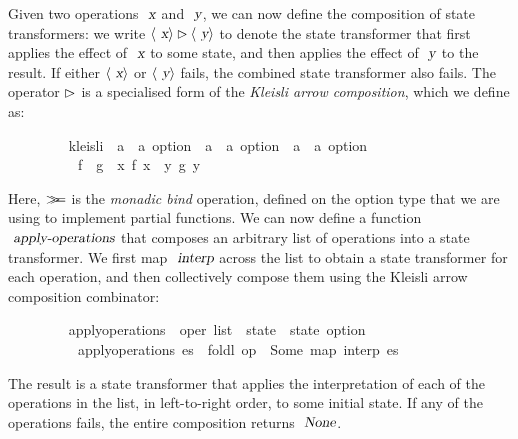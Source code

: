 Given two operations $\isa{x}$ and $\isa{y}$, we can now define the composition of state transformers: we write $\langle\isa{x}\rangle \mathbin{\isasymrhd} \langle\isa{y}\rangle$ to denote the state transformer that first applies the effect of $\isa{x}$ to some state, and then applies the effect of $\isa{y}$ to the result.
If either $\langle\isa{x}\rangle$ or $\langle\isa{y}\rangle$ fails, the combined state transformer also fails.
The operator $\emph{$\rhd$}$ is a specialised form of the \emph{Kleisli arrow composition}, which we define as:
\vspace{0.35em}
\begin{isabellebody}
\ \ \ \ \ \ \ \  kleisli\ {\isacharcolon}{\isacharcolon}\ {\isachardoublequoteopen}{\isacharparenleft}{\isacharprime}a\ {\isasymRightarrow}\ {\isacharprime}a\ option{\isacharparenright}\ {\isasymRightarrow}\ {\isacharparenleft}{\isacharprime}a\ {\isasymRightarrow}\ {\isacharprime}a\ option{\isacharparenright}\ {\isasymRightarrow}\ {\isacharparenleft}{\isacharprime}a\ {\isasymRightarrow}\ {\isacharprime}a\ option{\isacharparenright}{\isachardoublequoteclose}\ \isanewline
\ \ \ \ \ \ \ \ \ \ {\isachardoublequoteopen}f\ {\isasymrhd}\ g\ {\isasymequiv}\ {\isasymlambda}x{\isachardot}\ f\ x\ {\isasymbind}\ {\isacharparenleft}{\isasymlambda}y{\isachardot}\ g\ y{\isacharparenright}{\isachardoublequoteclose}
\end{isabellebody}
\vspace{0.35em}
Here, $\emph{$\mathbin{>\!\!\!>\mkern-6.7mu=}$}$ is the \emph{monadic bind} operation, defined on the option type that we are using to implement partial functions.
We can now define a function $\isa{apply-operations}$ that composes an arbitrary list of operations into a state transformer.
We first map $\isa{interp}$ across the list to obtain a state transformer for each operation, and then collectively compose them using the Kleisli arrow composition combinator:
\vspace{0.35em}
\begin{isabellebody}
\ \ \ \ \ \ \ \  apply{\isacharunderscore}operations\ {\isacharcolon}{\isacharcolon}\ {\isachardoublequoteopen}{\isacharprime}oper\ list\ {\isasymRightarrow}\ {\isacharprime}state\ {\isasymRightarrow}\ {\isacharprime}state\ option{\isachardoublequoteclose}\ \isanewline
\ \ \ \ \ \ \ \ \ \ {\isachardoublequoteopen}apply{\isacharunderscore}operations\ es\ {\isasymequiv}\ foldl\ {\isacharparenleft}op\ {\isasymrhd}{\isacharparenright}\ Some\ {\isacharparenleft}map\ interp\ es{\isacharparenright}{\isachardoublequoteclose}
\end{isabellebody}
\vspace{0.35em}
The result is a state transformer that applies the interpretation of each of the operations in the list, in left-to-right order, to some initial state.
If any of the operations fails, the entire composition returns $\isa{None}$.

